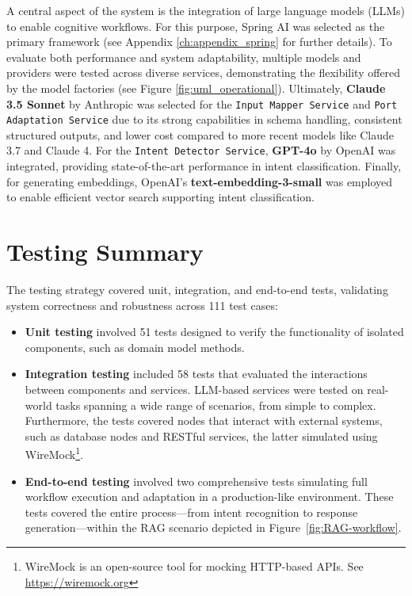 A central aspect of the system is the integration of large language models (LLMs) to enable cognitive workflows. For this purpose, Spring AI was selected as the primary framework (see Appendix \ref{ch:appendix_spring} for further details).
To evaluate both performance and system adaptability, multiple models and providers were tested across diverse services, demonstrating the flexibility offered by the model factories (see Figure \ref{fig:uml_operational}). Ultimately, \textbf{Claude 3.5 Sonnet} by Anthropic was selected for the \texttt{Input Mapper Service} and \texttt{Port Adaptation Service} due to its strong capabilities in schema handling, consistent structured outputs, and lower cost compared to more recent models like Claude 3.7 and Claude 4. For the \texttt{Intent Detector Service}, \textbf{GPT-4o} by OpenAI was integrated, providing state-of-the-art performance in intent classification. Finally, for generating embeddings, OpenAI’s \textbf{text-embedding-3-small} was employed to enable efficient vector search supporting intent classification.


\section*{Testing Summary}


The testing strategy covered unit, integration, and end-to-end tests, validating system correctness and robustness across 111 test cases:


\begin{itemize}[leftmargin=*, label=--]
    \item \textbf{Unit testing} involved 51 tests designed to verify the functionality of isolated components, such as domain model methods.
    
    \item \textbf{Integration testing} included 58 tests that evaluated the interactions between components and services. LLM-based services were tested on real-world tasks spanning a wide range of scenarios, from simple to complex. Furthermore, the tests covered nodes that interact with external systems, such as database nodes and RESTful services, the latter simulated using WireMock\footnote{WireMock is an open-source tool for mocking HTTP-based APIs. See \url{https://wiremock.org}}.
    
    \item \textbf{End-to-end testing} involved two comprehensive tests simulating full workflow execution and adaptation in a production-like environment. These tests covered the entire process—from intent recognition to response generation—within the RAG scenario depicted in Figure~\ref{fig:RAG-workflow}.
\end{itemize}


